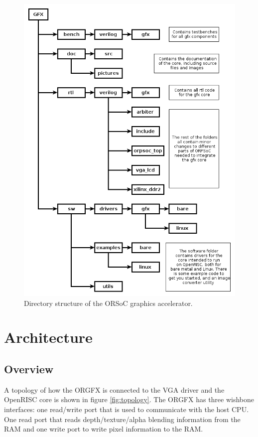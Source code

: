 \documentclass[10pt,a4paper]{article}
\begin{document}
\begin{figure}
\begin{center}
\includegraphics[scale=0.5]{../pictures/directory}
\caption{Directory structure of the ORSoC graphics accelerator.}
\label{fig:directory}
\end{center}
\end{figure}

\section{Architecture}
\subsection{Overview}
A topology of how the ORGFX is connected to the VGA driver and the OpenRISC core is shown in figure \ref{fig:topology}. The ORGFX has three wishbone interfaces: one read/write port that is used to communicate with the host CPU. One read port that reads depth/texture/alpha blending information from the RAM and one write port to write pixel information to the RAM.
\end{document}
